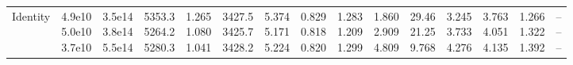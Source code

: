 \begin{landscape}
\begin{table}[t]
{\begin{tabular}{@{}lrrrrrrrrrrrrrr@{}}
Identity & \makecell[r]{4.9e10\\5.0e10\\3.7e10} & \makecell[r]{3.5e14\\3.8e14\\5.5e14} & \makecell[r]{5353.3\\5264.2\\5280.3} & \makecell[r]{1.265\\1.080\\1.041} & \makecell[r]{3427.5\\3425.7\\3428.2} & \makecell[r]{5.374\\5.171\\5.224} & \makecell[r]{0.829\\0.818\\0.820} & \makecell[r]{1.283\\1.209\\1.299} & \makecell[r]{1.860\\2.909\\4.809} & \makecell[r]{29.46\\21.25\\9.768} & \makecell[r]{3.245\\3.733\\4.276} & \makecell[r]{3.763\\4.051\\4.135} & \makecell[r]{1.266\\1.322\\1.392} & \makecell[r]{--\\--\\--} \\

\end{tabular}}
\end{table}
\end{landscape}
